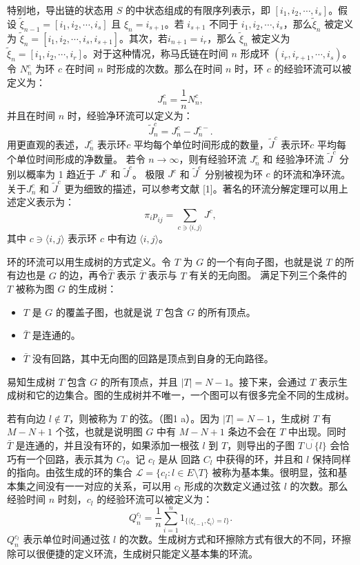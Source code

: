 特别地，导出链的状态用 $S$ 的中状态组成的有限序列表示，即 $[i_1,i_2,\cdots,i_s]$。假设 $\tilde{\xi}_{n-1}=[i_1,i_2,\cdots,i_s]$ 且 $\xi_n = i_{s+1}$。若 $i_{s+1}$ 不同于 $i_1,i_2,\cdots,i_s$，那么$\tilde{\xi}_n$ 被定义为 $\tilde{\xi}_n = [i_1,i_2,\cdots,i_s,i_{s+1}]$。其次，若$i_{n+1}=i_r$，那么 $\tilde{\xi}_n$ 被定义为 $\tilde{\xi}_n = [i_1,i_2,\cdots,i_r]$。对于这种情况，称马氏链在时间 $n$ 形成环 $(i_r,i_{r+1},\cdots,i_s)$。令 $N^c_n$ 为环 $c$ 在时间 $n$ 时形成的次数。那么在时间 $n$ 时，环 $c$ 的经验环流可以被定义为：
\begin{equation*}
    J_n^c = \frac{1}{n}N^c_n,
\end{equation*}
并且在时间 $n$ 时，经验净环流可以定义为：
\begin{equation*}
    \tilde{J}^c_n = J^c_n-J^{c-}_n.
\end{equation*}
用更直观的表述，$J^c_n$ 表示环$c$ 平均每个单位时间形成的数量，$\tilde{J}^c$ 表示环$c$ 平均每个单位时间形成的净数量。
若令 $n\rightarrow\infty$，则有经验环流 $J^c_n$ 和 经验净环流 $\tilde{J}^c$ 分别以概率为 1 趋近于 $J^c$ 和 $\tilde{J}^c$。
极限 $J^c$ 和 $\tilde{J}^c$ 分别被视为环 $c$ 的环流和净环流。关于$J^c_n$ 和 $\tilde{J}^c$ 更为细致的描述，可以参考文献 [1]。著名的环流分解定理可以用上述定义表示为：
\begin{equation}\label{decomposition}
    \pi_ip_{ij} = \sum_{c\ni\langle i,j\rangle}J^c,
\end{equation}
其中 $c \ni \langle i, j\rangle$ 表示环 $c$ 中有边 $\langle i, j\rangle$。

环的环流可以用生成树的方式定义。令 $T$ 为 $G$ 的一个有向子图，也就是说 $T$ 的所有边也是 $G$ 的边，再令$\hat{T}$ 表示 $\bar{T}$ 表示与 $T$ 有关的无向图。
满足下列三个条件的 $T$ 被称为图 $G$ 的生成树：
\begin{itemize}
    \item $T$ 是 $G$ 的覆盖子图，也就是说 $T$ 包含 $G$ 的所有顶点。
    \item $\bar{T}$ 是连通的。
    \item $\bar{T}$ 没有回路，其中无向图的回路是顶点到自身的无向路径。
\end{itemize}

易知生成树 $T$ 包含 $G$ 的所有顶点，并且 $|T| = N -1$。接下来，会通过 $T$ 表示生成树和它的边集合。图的生成树并不唯一，一个图可以有很多完全不同的生成树。

若有向边 $l \notin T$，则被称为 $T$ 的弦。（图1 a）。因为 $|T|= N-1$，生成树 $T$ 有 $M-N+1$ 个弦，也就是说明图 $G$ 中有 $M-N+1$ 条边不会在 $T$ 中出现。同时 $\bar{T}$ 是连通的，并且没有环的，如果添加一根弦 $l$ 到 $T$，则导出的子图 $\overline{T \cup \{l\}}$ 会恰巧有一个回路，表示其为 $C_l$。记 $c_l$ 是从 回路 $C_l$ 中获得的环，并且和 $l$ 保持同样的指向。由弦生成的环的集合 $\mathcal{L} = \{c_l: l\in E\setminus T\}$ 被称为基本集。很明显，弦和基本集之间没有一一对应的关系，可以用 $c_l$ 形成的次数定义通过弦 $l$ 的次数。那么经验时间 $n$ 时刻，$c_l$ 的经验环流可以被定义为：
\begin{equation*}
    Q^{c_l}_n = \frac{1}{n}\sum_{i=1}^n1_{\{\langle\xi_{i-1},\xi_i\rangle=l\}}.
\end{equation*}
$Q^{c_l}_n$ 表示单位时间通过弦 $l$ 的次数。生成树方式和环擦除方式有很大的不同，环擦除可以很便捷的定义环流，生成树只能定义基本集的环流。

